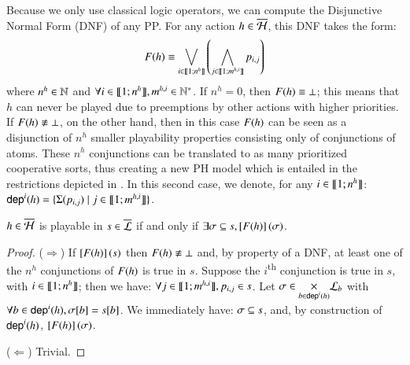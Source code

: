 \newcommand{\n}[1][h]{n^{#1}}
\newcommand{\m}[1][h,i]{m^{#1}}

Because we only use classical logic operators, we can compute the Disjunctive Normal Form (DNF) of any PP.
For any action $h \in \overline{\mathcal{H}}$, this DNF takes the form:
\[\Fop{h} \equiv \bigvee_{i \in \segm{1}{\n}} \left( \bigwedge_{j \in \segm{1}{\m}} p_{i,j} \right)\]
where $\n \in \sN$ and $\forall i \in \segm{1}{\n}, \m \in \sN^*$.
If $\n = 0$, then $F(h) \equiv \bot$; this means that $h$ can never be played
due to preemptions by other actions with higher priorities.
If $F(h) \not\equiv \bot$, on the other hand, then in this case $F(h)$
can be seen as a disjunction of $\n$ smaller playability properties consisting only of conjunctions of atoms.
These $\n$ conjunctions can be translated to as many prioritized cooperative sorts,
thus creating a new PH model which is entailed in the restrictions depicted in .
In this second case, we denote, for any $i \in \segm{1}{\n}$:
$\PHdep{i}{h} = \{ \PHsort(p_{i,j}) \mid j \in \segm{1}{\m} \}$.

\begin{theorem}
\label{th:ppplaysubset}
  $h \in \overline{\mathcal{H}}$ is playable in $s \in \overline{\mathcal{L}}$ if and only if
  $\exists \sigma \subseteq s, \left[F(h)\right](\sigma)$.
\end{theorem}
%
\begin{proof}
  ($\Rightarrow$) If $\left[F(h)\right](s)$ then $F(h) \not\equiv \bot$ and, by property of a DNF,
    at least one of the $\n$ conjunctions of $F(h)$ is true in $s$.
    Suppose the $i$\textsuperscript{th} conjunction is true in $s$, with $i \in \segm{1}{\n}$;
    then we have: $\forall j \in \segm{1}{\m}, p_{i,j} \in s$.
    Let $\sigma \in \underset{b \in \mathsf{dep}^{i}(h)}{\times} \mathcal{L}_b$ with $\forall b \in \mathsf{dep}^{i}(h), {\sigma[b]} = {s[b]}$.
    We immediately have: $\sigma \subseteq s$,
    and, by construction of $\mathsf{dep}^{i}(h)$, $\left[F(h)\right](\sigma)$.
  
  ($\Leftarrow$) Trivial.
\end{proof}

\newcommand{\flats}[1]{\lfloor #1 \rfloor}
\newcommand{\unflats}[1]{\lceil #1 \rceil}

